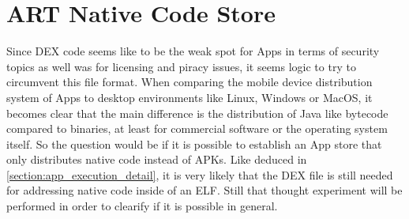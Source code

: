 \chapter{ART Native Code Store}\label{chapter:native_code_store}

Since DEX code seems like to be the weak spot for Apps in terms of security
topics as well was for licensing and piracy issues, it seems logic to try
to circumvent this file format. When comparing the mobile device distribution
system of Apps to desktop environments like Linux, Windows or MacOS, it becomes
clear that the main difference is the distribution of Java like bytecode compared to binaries, at least for commercial software or the operating system itself. So the question would be if it is possible to establish an App store that only distributes native code instead of APKs. Like deduced in \autoref{section:app_execution_detail}, it is very likely that the DEX file is still needed for addressing native code inside of an ELF.
Still that thought experiment will be performed in order to clearify if it is possible in general.

